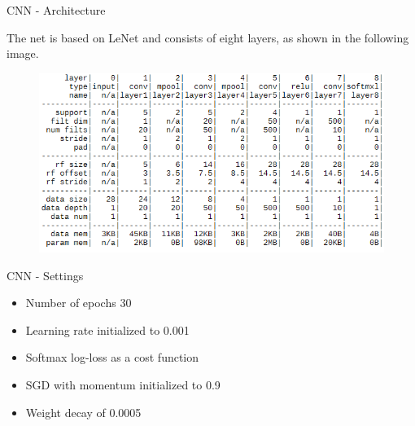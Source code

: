 \begin{tframe}{CNN - Architecture}

The net is based on LeNet and consists of eight layers, as shown in the following image.

\begin{figure}[h]
	\begin{center}
		\includegraphics[width=1\textwidth]{img/cnn.png}
	\end{center}
	\label{fig:cnn}
\end{figure}

\end{tframe}

\begin{tframe}{CNN - Settings}

\vspace{0.1in}
\vspace{0.1in}
\vspace{0.1in}

\begin{itemize}
\item Number of epochs 30
\item Learning rate initialized to 0.001
\item Softmax log-loss as a cost function
\item SGD with momentum initialized to 0.9
\item Weight decay of 0.0005
\end{itemize}


\end{tframe}